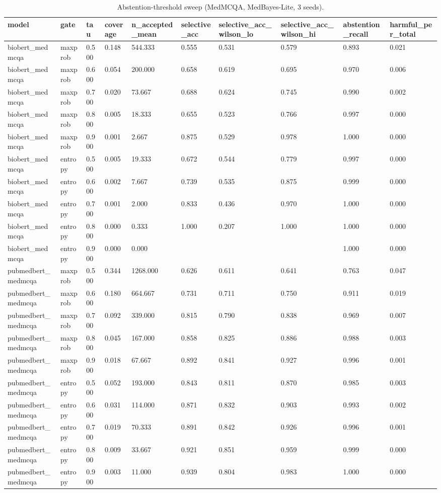 \begin{table}[htbp]
\centering
\caption{Abstention-threshold sweep (MedMCQA, MedBayes-Lite, 3 seeds).}
\label{tab:rev_S3_threshold_sweep}
\begin{tabular}{llllllllll}
\toprule
model & gate & tau & coverage & n\_accepted\_mean & selective\_acc & selective\_acc\_wilson\_lo & selective\_acc\_wilson\_hi & abstention\_recall & harmful\_per\_total \\
\midrule
biobert\_medmcqa & maxprob & 0.500 & 0.148 & 544.333 & 0.555 & 0.531 & 0.579 & 0.893 & 0.021 \\
biobert\_medmcqa & maxprob & 0.600 & 0.054 & 200.000 & 0.658 & 0.619 & 0.695 & 0.970 & 0.006 \\
biobert\_medmcqa & maxprob & 0.700 & 0.020 & 73.667 & 0.688 & 0.624 & 0.745 & 0.990 & 0.002 \\
biobert\_medmcqa & maxprob & 0.800 & 0.005 & 18.333 & 0.655 & 0.523 & 0.766 & 0.997 & 0.000 \\
biobert\_medmcqa & maxprob & 0.900 & 0.001 & 2.667 & 0.875 & 0.529 & 0.978 & 1.000 & 0.000 \\
biobert\_medmcqa & entropy & 0.500 & 0.005 & 19.333 & 0.672 & 0.544 & 0.779 & 0.997 & 0.000 \\
biobert\_medmcqa & entropy & 0.600 & 0.002 & 7.667 & 0.739 & 0.535 & 0.875 & 0.999 & 0.000 \\
biobert\_medmcqa & entropy & 0.700 & 0.001 & 2.000 & 0.833 & 0.436 & 0.970 & 1.000 & 0.000 \\
biobert\_medmcqa & entropy & 0.800 & 0.000 & 0.333 & 1.000 & 0.207 & 1.000 & 1.000 & 0.000 \\
biobert\_medmcqa & entropy & 0.900 & 0.000 & 0.000 &  &  &  & 1.000 & 0.000 \\
pubmedbert\_medmcqa & maxprob & 0.500 & 0.344 & 1268.000 & 0.626 & 0.611 & 0.641 & 0.763 & 0.047 \\
pubmedbert\_medmcqa & maxprob & 0.600 & 0.180 & 664.667 & 0.731 & 0.711 & 0.750 & 0.911 & 0.019 \\
pubmedbert\_medmcqa & maxprob & 0.700 & 0.092 & 339.000 & 0.815 & 0.790 & 0.838 & 0.969 & 0.007 \\
pubmedbert\_medmcqa & maxprob & 0.800 & 0.045 & 167.000 & 0.858 & 0.825 & 0.886 & 0.988 & 0.003 \\
pubmedbert\_medmcqa & maxprob & 0.900 & 0.018 & 67.667 & 0.892 & 0.841 & 0.927 & 0.996 & 0.001 \\
pubmedbert\_medmcqa & entropy & 0.500 & 0.052 & 193.000 & 0.843 & 0.811 & 0.870 & 0.985 & 0.003 \\
pubmedbert\_medmcqa & entropy & 0.600 & 0.031 & 114.000 & 0.871 & 0.832 & 0.903 & 0.993 & 0.002 \\
pubmedbert\_medmcqa & entropy & 0.700 & 0.019 & 70.333 & 0.891 & 0.842 & 0.926 & 0.996 & 0.001 \\
pubmedbert\_medmcqa & entropy & 0.800 & 0.009 & 33.667 & 0.921 & 0.851 & 0.959 & 0.999 & 0.000 \\
pubmedbert\_medmcqa & entropy & 0.900 & 0.003 & 11.000 & 0.939 & 0.804 & 0.983 & 1.000 & 0.000 \\
\bottomrule
\end{tabular}
\end{table}
